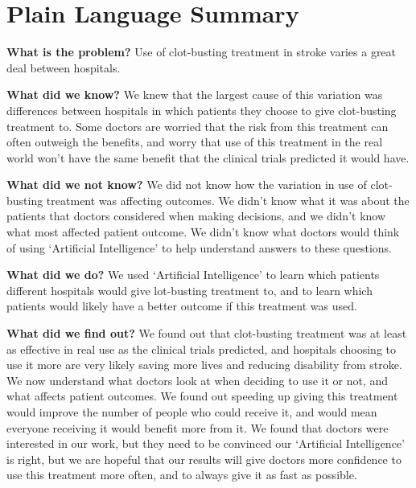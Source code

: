\section*{Plain Language Summary}

\textbf{What is the problem?} Use of clot-busting treatment in stroke varies a great deal between hospitals.

\textbf{What did we know?} We knew that the largest cause of this variation was differences between hospitals in which patients they choose to give  clot-busting treatment to. Some doctors are worried that the risk from this treatment can often outweigh the benefits, and worry that use of this treatment in the real world won’t have the same benefit that the clinical trials predicted it would have.

\textbf{What did we not know?} We did not know how the variation in use of clot-busting treatment was affecting outcomes. We didn’t know what it was about the patients that doctors considered when making decisions, and we didn’t know what most affected patient outcome. We didn’t know what doctors would think of using ‘Artificial Intelligence’ to help understand answers to these questions.

\textbf{What did we do?} We used ‘Artificial Intelligence’ to learn which patients different hospitals would give lot-busting treatment to, and to learn which patients would likely have a better outcome if this treatment was used.

\textbf{What did we find out?} We found out that clot-busting treatment was at least as effective in real use as the clinical trials predicted, and hospitals choosing to use it more are very likely saving more lives and reducing disability from stroke. We now understand what doctors look at when deciding to use it or not, and what affects patient outcomes. We  found out speeding up giving this treatment would improve the number of people who could receive it, and would mean everyone receiving it would benefit more from it. We found that doctors were interested in our work, but they need to be convinced our ‘Artificial Intelligence’ is right, but we are hopeful that our results will give doctors more confidence to use this treatment more often, and to always give it as fast as possible.